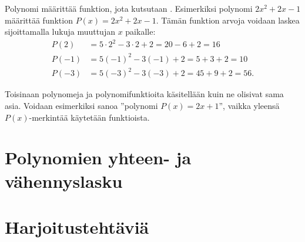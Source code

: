 

Polynomi määrittää funktion, jota kutsutaan . Esimerkiksi polynomi $2x^2+2x-1$ määrittää funktion $P(x)=2x^2+2x-1$. Tämän funktion arvoja voidaan laskea sijoittamalla lukuja muuttujan $x$ paikalle:
\begin{align*}
P(2) & = 5\cdot 2^2-3\cdot 2+2 = 20 - 6 + 2 = 16 \\
P(-1) & = 5(-1)^2-3(-1)+2 = 5 + 3 + 2 = 10 \\
P(-3) & = 5(-3)^2-3(-3)+2 = 45 + 9 + 2 = 56.
\end{align*}

Toisinaan polynomeja ja polynomifunktioita käsitellään kuin ne olisivat sama asia.
Voidaan esimerkiksi sanoa ''polynomi $P(x)=2x+1$'', vaikka yleensä $P(x)$-merkintää käytetään funktioista.


\section{Polynomien yhteen- ja vähennyslasku}



\section{Harjoitustehtäviä}


